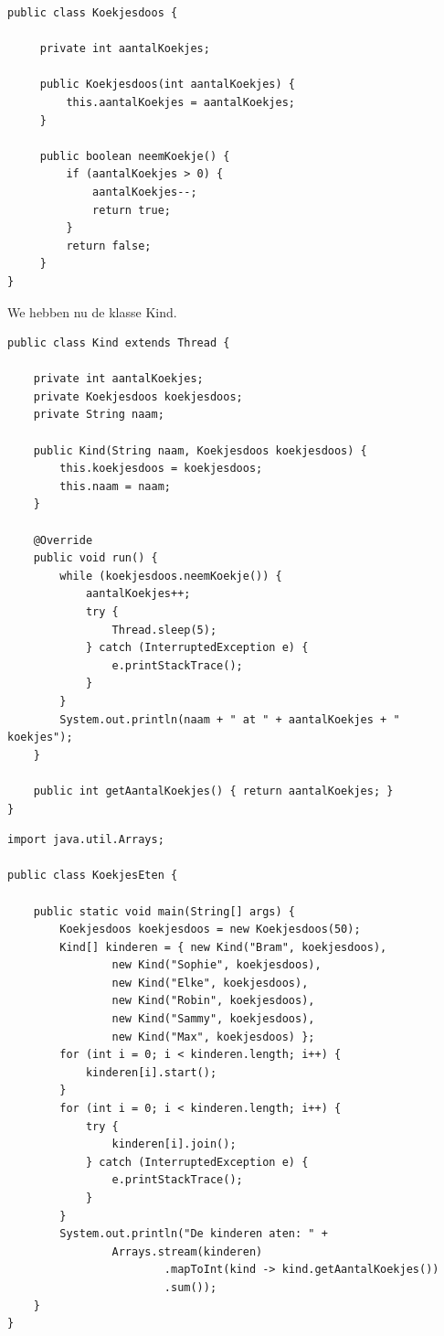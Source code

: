 \documentclass{tstextbook}
\begin{document}
\begin{lstlisting}
public class Koekjesdoos {  
     
     private int aantalKoekjes;      
     
     public Koekjesdoos(int aantalKoekjes) {      
         this.aantalKoekjes = aantalKoekjes;   
     }      
     
     public boolean neemKoekje() {      
         if (aantalKoekjes > 0) {         
             aantalKoekjes--;         
             return true;      
         }     
         return false;  
     }
}
\end{lstlisting}

We hebben nu de klasse Kind. 

\begin{lstlisting}
public class Kind extends Thread {

	private int aantalKoekjes;
	private Koekjesdoos koekjesdoos;
	private String naam;

	public Kind(String naam, Koekjesdoos koekjesdoos) {
		this.koekjesdoos = koekjesdoos;
		this.naam = naam;
	}

	@Override
	public void run() {
		while (koekjesdoos.neemKoekje()) {
			aantalKoekjes++;
			try {
				Thread.sleep(5);
			} catch (InterruptedException e) {
				e.printStackTrace();
			}
		}
		System.out.println(naam + " at " + aantalKoekjes + " koekjes");
	}

	public int getAantalKoekjes() { return aantalKoekjes; }
}
\end{lstlisting}

\begin{lstlisting}
import java.util.Arrays;

public class KoekjesEten {

	public static void main(String[] args) {
		Koekjesdoos koekjesdoos = new Koekjesdoos(50);
		Kind[] kinderen = { new Kind("Bram", koekjesdoos),
				new Kind("Sophie", koekjesdoos),
				new Kind("Elke", koekjesdoos),
				new Kind("Robin", koekjesdoos),
				new Kind("Sammy", koekjesdoos),
				new Kind("Max", koekjesdoos) };
		for (int i = 0; i < kinderen.length; i++) {
			kinderen[i].start();
		}
		for (int i = 0; i < kinderen.length; i++) {
			try {
				kinderen[i].join();
			} catch (InterruptedException e) {
				e.printStackTrace();
			}
		}
		System.out.println("De kinderen aten: " +
				Arrays.stream(kinderen)
						.mapToInt(kind -> kind.getAantalKoekjes())
						.sum());
	}
}
\end{lstlisting}
\end{document}
